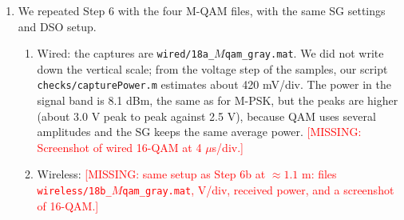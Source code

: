 \documentclass[11pt]{article}
\newcommand{\missing}[1]{\textcolor{red}{[MISSING: #1]}}
\begin{document}
\begin{enumerate}[resume]
    \item We repeated Step 6 with the four M-QAM files, with the same SG settings and DSO setup.
    \begin{enumerate}[label=\alph*)]
        \item Wired: the captures are \texttt{wired/18a\_$M$qam\_gray.mat}. We did not write down the vertical scale; from the voltage step of the samples, our script \texttt{checks/capturePower.m} estimates about 420 mV/div. The power in the signal band is 8.1 dBm, the same as for M-PSK, but the peaks are higher (about 3.0 V peak to peak against 2.5 V), because QAM uses several amplitudes and the SG keeps the same average power. \missing{Screenshot of wired 16-QAM at 4 $\mu$s/div.}
        \item Wireless: \missing{same setup as Step 6b at $\approx 1.1$ m: files \texttt{wireless/18b\_$M$qam\_gray.mat}, V/div, received power, and a screenshot of 16-QAM.}
    \end{enumerate}
\end{enumerate}
\end{document}
